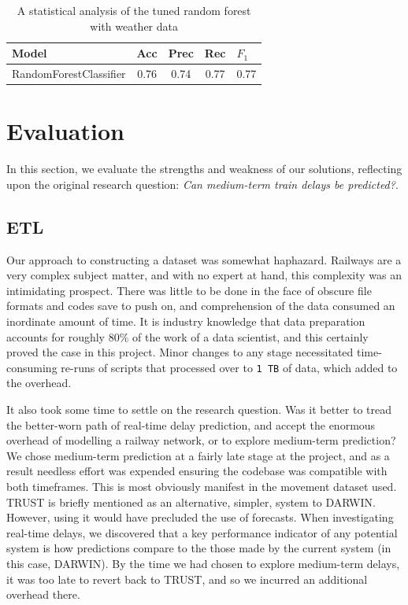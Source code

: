 \documentclass[12pt,a4paper]{article}
\begin{document}
\begin{table}[htb]
\centering
\caption{A statistical analysis of the tuned random forest with weather data}
\label{table:results_weather}
\begin{tabular}{|p{5cm}|c|c|c|c|}
\hline
\textbf{Model}                  & \multicolumn{1}{l|}{\textbf{Acc}} & \multicolumn{1}{l|}{\textbf{Prec}} & \multicolumn{1}{l|}{\textbf{Rec}} & \multicolumn{1}{l|}{\textbf{$F_1$}} \\ \hline
RandomForestClassifier & 0.76                     & 0.74                     & 0.77                     & 0.77                      \\ \hline
\end{tabular}
\end{table}

\clearpage
\section{Evaluation}

In this section, we evaluate the strengths and weakness of our solutions, reflecting upon the original research question: \textit{Can medium-term train delays be predicted?}.

\subsection{ETL}

Our approach to constructing a dataset was somewhat haphazard. Railways are a very complex subject matter, and with no expert at hand, this complexity was an intimidating prospect. There was little to be done in the face of obscure file formats and codes save to push on, and comprehension of the data consumed an inordinate amount of time.  It is industry knowledge that data preparation accounts for roughly $80\%$ of the work of a data scientist, and this certainly proved the case in this project. Minor changes to any stage necessitated time-consuming re-runs of scripts that processed over to \verb|1 TB| of data, which added to the overhead. 

It also took some time to settle on the research question. Was it better to tread the better-worn path of real-time delay prediction, and accept the enormous overhead of modelling a railway network, or to explore medium-term prediction? We chose medium-term prediction at a fairly late stage at the project, and as a result needless effort was expended ensuring the codebase was compatible with both timeframes. This is most obviously manifest in the movement dataset used. TRUST is briefly mentioned as an alternative, simpler, system to DARWIN. However, using it would have precluded the use of forecasts. When investigating real-time delays, we discovered that a key performance indicator of any potential system is how predictions compare to the those made by the current system (in this case, DARWIN). By the time we had chosen to explore medium-term delays, it was too late to revert back to TRUST, and so we incurred an additional overhead there. 
\end{document}

